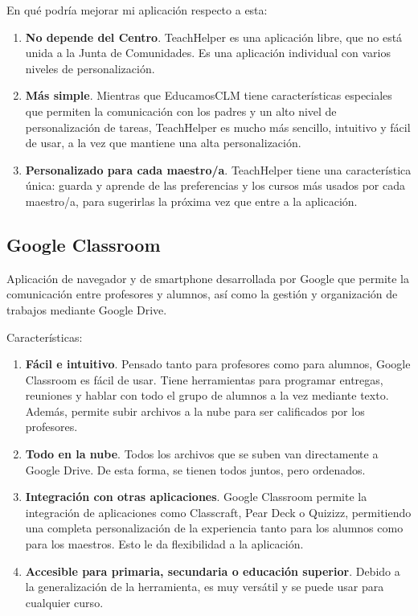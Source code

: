 En qué podría mejorar mi aplicación respecto a esta:

\begin{enumerate}
    \item \textbf{No depende del Centro}. TeachHelper es una aplicación libre, que no está unida a la Junta de Comunidades. Es una aplicación individual con varios niveles de personalización.
    \item \textbf{Más simple}. Mientras que EducamosCLM tiene características especiales que permiten la comunicación con los padres y un alto nivel de personalización de tareas, TeachHelper es mucho más sencillo, intuitivo y fácil de usar, a la vez que mantiene una alta personalización.
    \item \textbf{Personalizado para cada maestro/a}. TeachHelper tiene una característica única: guarda y aprende de las preferencias y los cursos más usados por cada maestro/a, para sugerirlas la próxima vez que entre a la aplicación.
\end{enumerate}

\subsection{Google Classroom}

Aplicación de navegador y de smartphone desarrollada por Google que permite la comunicación entre profesores y alumnos, así como la gestión y organización de trabajos mediante Google Drive.

Características:

\begin{enumerate}
	\item \textbf{Fácil e intuitivo}. Pensado tanto para profesores como para alumnos, Google Classroom es fácil de usar. Tiene herramientas para programar entregas, reuniones y hablar con todo el grupo de alumnos a la vez mediante texto. Además, permite subir archivos a la nube para ser calificados por los profesores.
	\item \textbf{Todo en la nube}. Todos los archivos que se suben van directamente a Google Drive. De esta forma, se tienen todos juntos, pero ordenados.
	\item \textbf{Integración con otras aplicaciones}. Google Classroom permite la integración de aplicaciones como Classcraft, Pear Deck o Quizizz, permitiendo una completa personalización de la experiencia tanto para los alumnos como para los maestros. Esto le da flexibilidad a la aplicación.
	\item \textbf{Accesible para primaria, secundaria o educación superior}. Debido a la generalización de la herramienta, es muy versátil y se puede usar para cualquier curso.
\end{enumerate}

